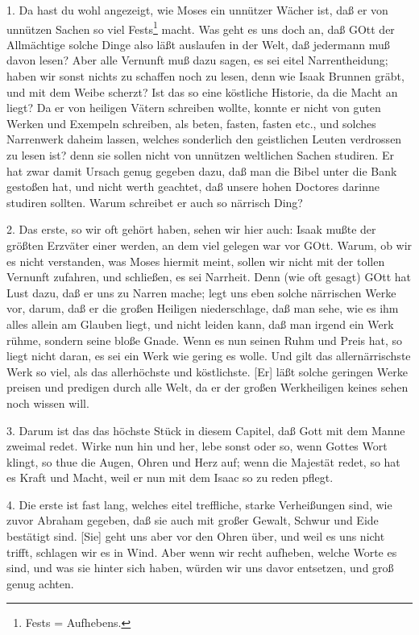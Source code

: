 1. Da hast du wohl angezeigt, wie Moses ein unnützer Wächer ist, daß er von unnützen Sachen so viel Fests\footnote{Fests = Aufhebens.} macht. Was geht es uns doch an, daß GOtt der Allmächtige solche Dinge also läßt auslaufen in der Welt, daß jedermann muß davon lesen? Aber alle Vernunft muß dazu sagen, es sei eitel Narrentheidung; haben wir sonst nichts zu schaffen noch zu lesen, denn wie Isaak Brunnen gräbt, und mit dem Weibe scherzt? Ist das so eine köstliche Historie, da die Macht an liegt? Da er von heiligen Vätern schreiben wollte, konnte er nicht von guten Werken und Exempeln schreiben, als beten, fasten, fasten etc., und solches Narrenwerk daheim lassen, welches sonderlich den geistlichen Leuten verdrossen zu lesen ist? denn sie sollen nicht von unnützen weltlichen Sachen studiren. Er hat zwar damit Ursach genug gegeben dazu, daß man die Bibel unter die Bank gestoßen hat, und nicht werth geachtet, daß unsere hohen Doctores darinne studiren sollten. Warum schreibet er auch so närrisch Ding?

2. Das erste, so wir oft gehört haben, sehen wir hier auch: Isaak mußte der größten Erzväter einer werden, an dem viel gelegen war vor GOtt. Warum, ob wir es nicht verstanden, was Moses hiermit meint, sollen wir nicht mit der tollen Vernunft zufahren, und schließen, es sei Narrheit. Denn (wie oft gesagt) GOtt hat
Lust dazu, daß er uns zu Narren mache; legt uns eben solche närrischen Werke vor, darum, daß er die großen Heiligen niederschlage, daß man sehe, wie es ihm alles allein am Glauben liegt, und nicht leiden kann, daß man irgend ein Werk rühme, sondern seine bloße Gnade. Wenn es nun seinen Ruhm und Preis hat, so liegt nicht daran, es sei ein Werk wie gering es wolle. Und gilt das allernärrischste Werk so viel, als das allerhöchste und köstlichste. [Er] läßt solche geringen Werke preisen und predigen durch alle Welt, da er der großen Werkheiligen keines sehen noch wissen will.

3. Darum ist das das höchste Stück in diesem Capitel, daß Gott mit dem Manne zweimal redet. Wirke nun hin und her, lebe sonst oder so, wenn Gottes Wort klingt, so thue die Augen, Ohren und Herz auf; wenn die Majestät redet, so hat es Kraft und Macht, weil er nun mit dem Isaac so zu reden pflegt.

4. Die erste ist fast lang, welches eitel treffliche, starke Verheißungen sind, wie zuvor Abraham gegeben, daß sie auch mit großer Gewalt, Schwur und Eide bestätigt sind. [Sie] geht uns aber vor den Ohren über, und weil es uns nicht trifft, schlagen wir es in Wind. Aber wenn wir recht aufheben, welche Worte es sind, und was sie hinter sich haben, würden wir uns davor entsetzen, und groß genug achten.

